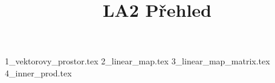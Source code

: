 \documentclass[a4paper]{article}
\begin{document}
\title{LA2 Přehled}

\maketitle
\pagebreak

{1_vektorovy_prostor.tex}
{2_linear_map.tex}
{3_linear_map_matrix.tex}
{4_inner_prod.tex}
\end{document}
